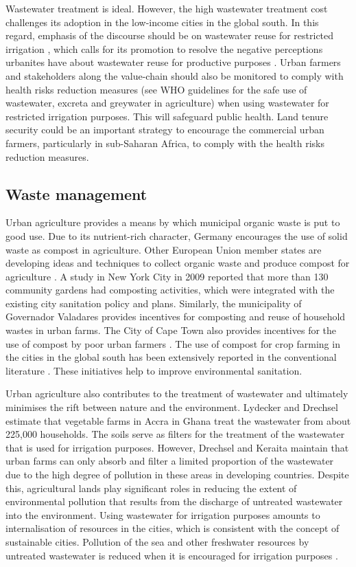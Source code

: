 Wastewater treatment is ideal. However, the high wastewater treatment cost challenges its adoption in the low-income cities in the global south. In this regard, emphasis of the discourse should be on wastewater reuse for restricted irrigation \cite{Hamilton2014}, which calls for its promotion to resolve the negative perceptions urbanites have about wastewater reuse for productive purposes \cite{Mayilla2017}. Urban farmers and stakeholders along the value-chain should also be monitored to comply with health risks reduction measures (see WHO guidelines for the safe use of wastewater, excreta and greywater in agriculture) when using wastewater for restricted irrigation purposes. This will safeguard public health. Land tenure security could be an important strategy to encourage the commercial urban farmers, particularly in sub-Saharan Africa, to comply with the health risks reduction measures.

\subsection{Waste management}

Urban agriculture provides a means by which municipal organic waste is put to good use. Due to its nutrient-rich character, Germany encourages the use of solid waste as compost in agriculture. Other European Union member states are developing ideas and techniques to collect organic waste and produce compost for agriculture \cite{Anastasiou2014}. A study in New York City in 2009 reported that more than 130 community gardens had composting activities, which were integrated with the existing city sanitation policy and plans. Similarly, the municipality of Governador Valadares provides incentives for composting and reuse of household wastes in urban farms. The City of Cape Town also provides incentives for the use of compost by poor urban farmers \cite{Hoornweg2012}. The use of compost for crop farming in the cities in the global south has been extensively reported in the conventional literature \cite{Amoah2007}. These initiatives help to improve environmental sanitation.

Urban agriculture also contributes to the treatment of wastewater and ultimately minimises the rift between nature and the environment. Lydecker and Drechsel \cite{Lydecker2010} estimate that vegetable farms in Accra in Ghana treat the wastewater from about 225,000 households. The soils serve as filters for the treatment of the wastewater that is used for irrigation purposes. However, Drechsel and Keraita \cite{Drechsel2014} maintain that urban farms can only absorb and filter a limited proportion of the wastewater due to the high degree of pollution in these areas in developing countries. Despite this, agricultural lands play significant roles in reducing the extent of environmental pollution that results from the discharge of untreated wastewater into the environment. Using wastewater for irrigation purposes amounts to internalisation of resources in the cities, which is consistent with the concept of sustainable cities. Pollution of the sea and other freshwater resources by untreated wastewater is reduced when it is encouraged for irrigation purposes \cite{Liu2013}.

